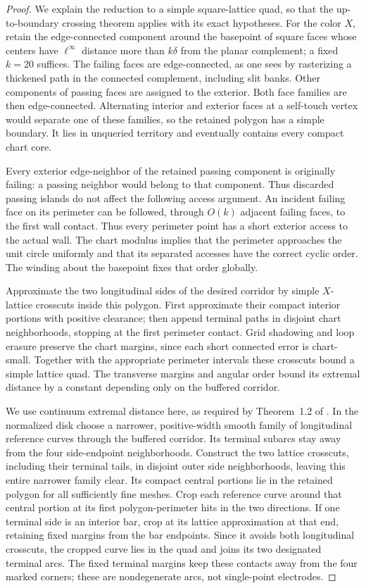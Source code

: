 \begin{proof}
We explain the reduction to a simple square-lattice quad, so that the
up-to-boundary crossing theorem applies with its exact hypotheses.
For the color $X$, retain the edge-connected component around the
basepoint of square faces whose centers have $\ell^\infty$ distance
more than $k\delta$ from the planar complement; a fixed $k=20$
suffices.  The failing faces are edge-connected, as one sees by
rasterizing a thickened path in the connected complement, including
slit banks.  Other components of passing faces are assigned to the
exterior.  Both face families are then edge-connected.  Alternating
interior and exterior faces at a self-touch vertex would separate one
of these families, so the retained polygon has a simple boundary.
It lies in unqueried territory and eventually contains every compact
chart core.

Every exterior edge-neighbor of the retained passing component is
originally failing: a passing neighbor would belong to that component.
Thus discarded passing islands do not affect the following access
argument.  An incident failing face on its perimeter can be followed, through
$O(k)$ adjacent failing faces, to the first wall contact.  Thus every
perimeter point has a short exterior access to the actual wall.  The
chart modulus implies that the perimeter approaches the unit circle
uniformly and that its separated accesses have the correct cyclic
order.  The winding about the basepoint fixes that order globally.

Approximate the two longitudinal sides of the desired corridor by
simple $X$-lattice crosscuts inside this polygon.  First approximate
their compact interior portions with positive clearance; then append
terminal paths in disjoint chart neighborhoods, stopping at the first
perimeter contact.  Grid shadowing and loop erasure preserve the chart
margins, since each short connected error is chart-small.  Together
with the appropriate perimeter intervals these crosscuts bound a
simple lattice quad.  The transverse margins and angular order bound
its extremal distance by a constant depending only on the buffered
corridor.

We use continuum extremal distance here, as required by
Theorem~1.2 of \citet{DMT2021Fractal}.  In the normalized disk choose
a narrower, positive-width smooth family of longitudinal reference
curves through the buffered corridor.  Its terminal subarcs stay away
from the four side-endpoint neighborhoods.  Construct the two lattice
crosscuts, including their terminal tails, in disjoint outer side
neighborhoods, leaving this entire narrower family clear.  Its compact
central portions lie in the retained polygon for all sufficiently fine
meshes.  Crop each reference curve around that central portion at its
first polygon-perimeter hits in the two directions.  If one terminal
side is an interior bar, crop at its lattice approximation at that end,
retaining fixed margins from the bar endpoints.  Since it avoids
both longitudinal crosscuts, the cropped curve lies in the quad and
joins its two designated terminal arcs.  The fixed terminal margins
keep these contacts away from the four marked corners; these are
nondegenerate arcs, not single-point electrodes.


\end{proof}
